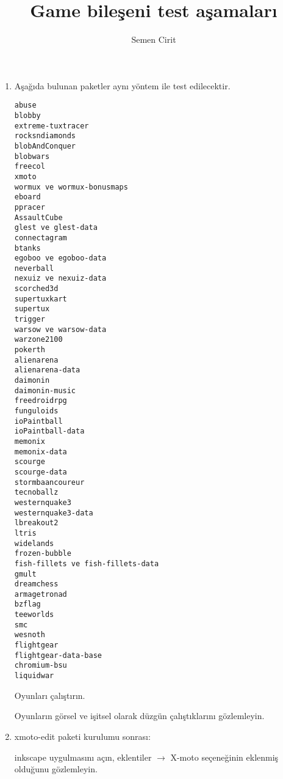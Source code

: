 \documentclass[a4paper,10pt]{article}
\title{Game bileşeni test aşamaları}
\author{Semen Cirit}
\begin{document}
\maketitle

\begin{enumerate}
\item Aşağıda bulunan paketler aynı yöntem ile test edilecektir.
\begin{verbatim}
abuse
blobby
extreme-tuxtracer
rocksndiamonds 
blobAndConquer
blobwars
freecol
xmoto
wormux ve wormux-bonusmaps
eboard
ppracer
AssaultCube
glest ve glest-data
connectagram
btanks
egoboo ve egoboo-data
neverball
nexuiz ve nexuiz-data
scorched3d
supertuxkart
supertux
trigger
warsow ve warsow-data
warzone2100
pokerth
alienarena
alienarena-data
daimonin
daimonin-music
freedroidrpg
funguloids
ioPaintball
ioPaintball-data
memonix
memonix-data
scourge
scourge-data
stormbaancoureur
tecnoballz
westernquake3
westernquake3-data
lbreakout2
ltris
widelands
frozen-bubble
fish-fillets ve fish-fillets-data
gmult
dreamchess
armagetronad
bzflag
teeworlds
smc
wesnoth
flightgear
flightgear-data-base
chromium-bsu
liquidwar
\end{verbatim}

Oyunları çalıştırın.

Oyunların görsel ve işitsel olarak düzgün çalıştıklarını gözlemleyin.

\item xmoto-edit paketi kurulumu sonrası:

inkscape uygulmasını açın, eklentiler $\rightarrow$ X-moto seçeneğinin eklenmiş olduğunu gözlemleyin.
\end{enumerate}
\end{document}
